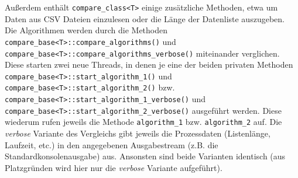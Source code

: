 Außerdem enthält \texttt{compare\_class<T>} einige zusätzliche Methoden, etwa um Daten aus \ac{CSV} Dateien einzulesen oder die Länge der Datenliste auszugeben.\\[0.25 cm]
Die Algorithmen werden durch die Methoden\\ \texttt{compare\_base<T>::compare\_algorithms()} und \\
\texttt{compare\_base<T>::compare\_algorithms\_verbose()} miteinander verglichen.\\
Diese starten zwei neue Threads, in denen je eine der beiden privaten Methoden \texttt{compare\_base<T>::start\_algorithm\_1()} und\\ \texttt{compare\_base<T>::start\_algorithm\_2()} bzw.\\ \texttt{compare\_base<T>::start\_algorithm\_1\_verbose()} und\\ \texttt{compare\_base<T>::start\_algorithm\_2\_verbose()} ausgeführt werden. Diese wiederum rufen jeweils die Methode \texttt{algorithm\_1} bzw. \texttt{algorithm\_2} auf. Die \textit{verbose} Variante des Vergleichs gibt jeweils die Prozessdaten (Listenlänge, Laufzeit, etc.) in den angegebenen Ausgabestream  (z.B. die Standardkonsolenausgabe) aus. Ansonsten sind beide Varianten identisch (aus Platzgründen wird hier nur die \textit{verbose} Variante aufgeführt).

